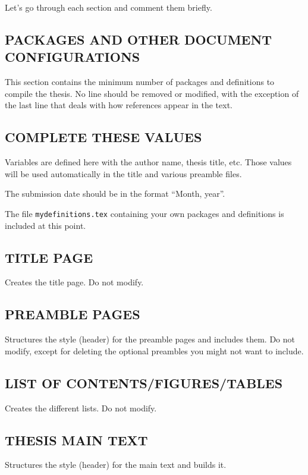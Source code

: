 Let's go through each section and comment them briefly.

\subsection{PACKAGES AND OTHER DOCUMENT CONFIGURATIONS}

This section contains the minimum number of packages and definitions to compile the thesis. No line should be removed or modified, with the exception of the last line that deals with how references appear in the text.

\subsection{COMPLETE THESE VALUES}

Variables are defined here with the author name, thesis title, etc. Those values will be used automatically in the title and various preamble files.

The submission date should be in the format ``Month, year''. 

The file \texttt{mydefinitions.tex} containing your own packages and definitions is included at this point.

\subsection{TITLE PAGE}

Creates the title page. Do not modify.

\subsection{PREAMBLE PAGES}

Structures the style (header) for the preamble pages and includes them. Do not modify, except for deleting the optional preambles you might not want to include.

\subsection{LIST OF CONTENTS/FIGURES/TABLES}

Creates the different lists. Do not modify.

\subsection{THESIS MAIN TEXT}

Structures the style (header) for the main text and builds it. 

